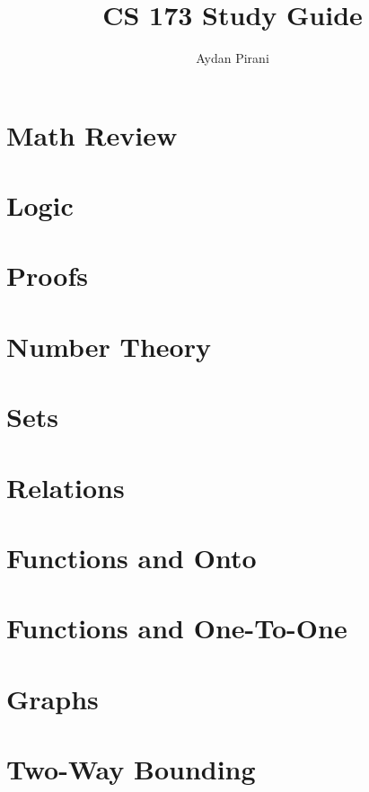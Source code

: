 \documentclass{article}
\title{CS 173 Study Guide}
\author{Aydan Pirani}
\begin{document}
\maketitle
\tableofcontents
\pagebreak

\section{Math Review}


\section{Logic}


\section{Proofs}


\section{Number Theory}


\section{Sets}


\section{Relations}


\section{Functions and Onto}


\section{Functions and One-To-One}


\section{Graphs}



\section{Two-Way Bounding}

\end{document}
